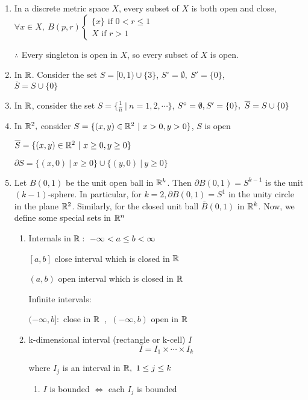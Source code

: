 \begin{enumerate}[wide,label = \textbf{\arabic*.}]
	\item In a discrete metric space $X$, every subset of $X$ is both open and close, $\forall x \in X,~B(p,r) \begin{cases}
		\{x\} \text{ if } 0<r\leq 1\\ X \text{ if } r>1
	\end{cases} $
	
	$\therefore$ Every singleton is open in $X$, so every subset of $X$ is open.
	\item In $\mathbb{R}$. Consider the set $S = [0,1) \cup \{3\}$, $S^\circ = \emptyset,~S' =\{0\}$, \\$\overline{S} = S \cup \{0\}$
	\item In $\mathbb{R}$, consider the set $S = \{\frac{1}{n}~|~n = 1,2,\cdots\}$, $S^\circ = \emptyset,~\\S' = \{0\},~\overline{S} = S \cup \{0\}$
	\item In $\mathbb{R}^2,$ consider $S = \{(x,y) \in \mathbb{R}^2~|~x>0,y>0\}$, $S$ is open
	
	$\overline{S} = \{(x,y) \in \mathbb{R}^2~|~x \geq 0,y \geq 0\}$
	
	$\partial S = \{(x,0)~|~x \geq 0\} \cup \{(y,0)~|~y\geq 0\}$
	\item Let $B(0,1)$ be the unit open ball in $\mathbb{R}^k$. Then $\partial B(0,1) = S^{k-1}$ is the unit $(k-1)$-sphere. In particular, for $k =2, \partial B(0,1) = S^1$ in the unity circle in the plane $\mathbb{R}^2$. Similarly, for the closed unit ball $\overline{B}(0,1)$ in $\mathbb{R}^k$. Now, we define some special sets in $\mathbb{R}^n$
	\begin{enumerate}[label = $\bullet$]
		\item Internals in $\mathbb{R}:~- \infty < a \leq b < \infty$
		
		$[a,b]$ close interval which is closed in $\mathbb{R}$
		
		$(a,b)$ open interval which is closed in $\mathbb{R}$
		
		Infinite intervals:
		
		$(-\infty,b]:$ close in $\mathbb{R}$~,~$(-\infty,b)$ open in $\mathbb{R}$
		\item k-dimensional interval (rectangle or k-cell) $I$
		$$I = I_1 \times \cdots \times I_k$$
		
		where $I_j$ is an interval in $\mathbb{R},~1\leq j \leq k$
		\begin{enumerate}
			\item $I$ is bounded $\Leftrightarrow$ each $I_j$ is bounded
			

\end{enumerate}
\end{enumerate}
\end{enumerate}
